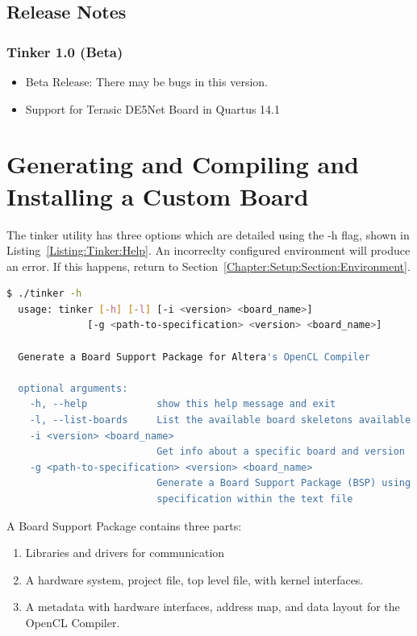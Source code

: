 \documentclass{refrep}
\begin{document}
\section{Release Notes}
\subsection{Tinker 1.0 (Beta)}
\begin{itemize}
  \item Beta Release: There may be bugs in this version. 
  \item Support for Terasic DE5Net Board in Quartus 14.1
\end{itemize}

\pagebreak
\chapter{Generating and Compiling and Installing a Custom Board}
\label{Chapter:Generating}

The tinker utility has three options which are detailed using the -h flag, shown
in Listing~\ref{Listing:Tinker:Help}. An incorreclty configured environment will
produce an error. If this happens, return to Section~\ref{Chapter:Setup:Section:Environment}.

\begin{lstlisting}[language=bash,basicstyle=\footnotesize\ttfamily,commentstyle=\color{red},
    label=Listing:Tinker:Help,captionpos=b,
    caption=Output from running ./tinker -h in a correctly configured environment,frame=single]
  $ ./tinker -h
  usage: tinker [-h] [-l] [-i <version> <board_name>]
              [-g <path-to-specification> <version> <board_name>]

  Generate a Board Support Package for Altera's OpenCL Compiler

  optional arguments:
    -h, --help            show this help message and exit
    -l, --list-boards     List the available board skeletons available to Tinker
    -i <version> <board_name>
                          Get info about a specific board and version
    -g <path-to-specification> <version> <board_name>
                          Generate a Board Support Package (BSP) using the
                          specification within the text file
\end{lstlisting}



A Board Support Package contains three parts:
\begin{enumerate}
\item Libraries and drivers for communication 
\item A hardware system, project file, top level file, with kernel
  interfaces.
\item A metadata with hardware interfaces, address map, and data
  layout for the OpenCL Compiler.
\end{enumerate}
\end{document}
